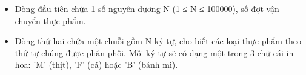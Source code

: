 \begin{itemize}
	\item     Dòng đầu tiên chứa 1 số nguyên dương N (1 ≤ N ≤ 100000), số đợt vận chuyển thực phẩm.   
	\item     Dòng thứ hai chứa một chuỗi gồm N ký tự, cho biết các loại thực phẩm theo thứ tự chúng được phân phối. Mỗi ký tự sẽ có dạng một trong 3 chữ cái in hoa: 'M' (thịt), 'F' (cá) hoặc 'B' (bánh mì).   
\end{itemize}